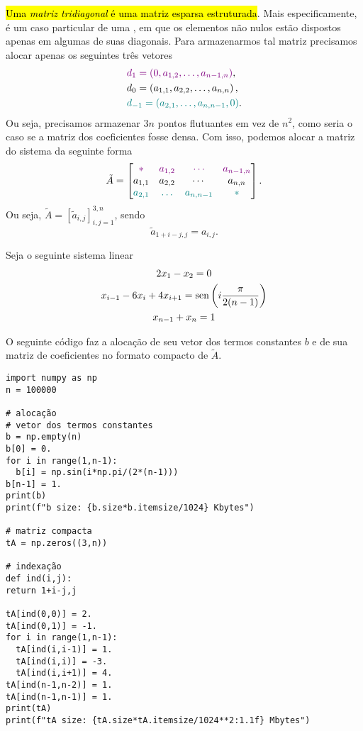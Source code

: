 \hl{Uma \emph{matriz tridiagonal} é uma matriz esparsa estruturada}. Mais especificamente, é um caso particular de uma , em que os elementos não nulos estão dispostos apenas em algumas de suas diagonais. Para armazenarmos tal matriz precisamos alocar apenas os seguintes três vetores
\begin{align}
  & {\color{violet}d_{1} = \left(0,a_{1,2},\dotsc,a_{n-1,n}\right)},\\
  & d_{0} = \left(a_{1,1},a_{2,2},\dotsc,a_{n,n}\right),\\
  & {\color{teal}d_{-1} = \left(a_{2,1},\dotsc,a_{n,n-1},0\right)}.
\end{align}
Ou seja, precisamos armazenar $3n$ pontos flutuantes em vez de $n^2$, como seria o caso se a matriz dos coeficientes fosse densa. Com isso, podemos alocar a matriz do sistema da seguinte forma
\begin{equation}
  \tilde{A} =
  \begin{bmatrix}
    {\color{violet}*} & {\color{violet}a_{1,2}} & {\color{violet}\cdots} & {\color{violet}a_{n-1,n}}\\
    a_{1,1} & a_{2,2} & \cdots & a_{n,n}\\
    {\color{teal}a_{2,1}} & {\color{teal}\dotsc} & {\color{teal}a_{n,n-1}} & {\color{teal}*}
  \end{bmatrix}.
\end{equation}
Ou seja, $\tilde{A} = [\tilde{a}_{i,j}]_{i,j=1}^{3,n}$, sendo
\begin{equation}
  \tilde{a}_{1+i-j,j} = a_{i,j}.
\end{equation}

\begin{ex}
  Seja o seguinte sistema linear
  \begin{gather}
    2x_1 - x_2 = 0\\
    x_{i-1} - 6x_i + 4x_{i+1} = \operatorname{sen}\left(i\frac{\pi}{2(n-1)}\right)\\
    x_{n-1} + x_n = 1
  \end{gather}
  
  O seguinte código {\python} faz a alocação de seu vetor dos termos constantes $b$ e de sua matriz de coeficientes no formato compacto de $\tilde{A}$.

\begin{lstlisting}[caption=diagSis.py, label={py:diagSis}]
import numpy as np
n = 100000

# alocação
# vetor dos termos constantes
b = np.empty(n)
b[0] = 0.
for i in range(1,n-1):
  b[i] = np.sin(i*np.pi/(2*(n-1)))
b[n-1] = 1.
print(b)
print(f"b size: {b.size*b.itemsize/1024} Kbytes")

# matriz compacta
tA = np.zeros((3,n))

# indexação
def ind(i,j):
return 1+i-j,j

tA[ind(0,0)] = 2.
tA[ind(0,1)] = -1.
for i in range(1,n-1):
  tA[ind(i,i-1)] = 1.
  tA[ind(i,i)] = -3.
  tA[ind(i,i+1)] = 4.
tA[ind(n-1,n-2)] = 1.
tA[ind(n-1,n-1)] = 1.
print(tA)
print(f"tA size: {tA.size*tA.itemsize/1024**2:1.1f} Mbytes")
\end{lstlisting}

\end{ex}

